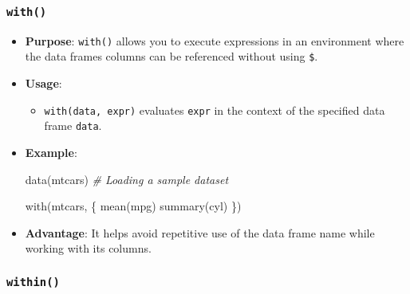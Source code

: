\documentclass[
]{article}
\newenvironment{Shaded}{}{}
\newcommand{\CommentTok}[1]{\textcolor[rgb]{0.38,0.63,0.69}{\textit{#1}}}
\newcommand{\FunctionTok}[1]{\textcolor[rgb]{0.02,0.16,0.49}{#1}}
\newcommand{\NormalTok}[1]{#1}
\begin{document}
\hypertarget{with}{%
\subsubsection{\texorpdfstring{\texttt{with()}}{with()}}\label{with}}

\begin{itemize}
\item
  \textbf{Purpose}: \texttt{with()} allows you to execute expressions in
  an environment where the data frame\textquotesingle s columns can be
  referenced without using \texttt{\$}.
\item
  \textbf{Usage}:

  \begin{itemize}
  \item
    \texttt{with(data,\ expr)} evaluates \texttt{expr} in the context of
    the specified data frame \texttt{data}.
  \end{itemize}
\item
  \textbf{Example}:

\begin{Shaded}
\begin{Highlighting}[]
\FunctionTok{data}\NormalTok{(mtcars) }\CommentTok{\# Loading a sample dataset}

\FunctionTok{with}\NormalTok{(mtcars, \{}
  \FunctionTok{mean}\NormalTok{(mpg)}
  \FunctionTok{summary}\NormalTok{(cyl)}
\NormalTok{  \})}
\end{Highlighting}
\end{Shaded}
\item
  \textbf{Advantage}: It helps avoid repetitive use of the data frame
  name while working with its columns.
\end{itemize}

\hypertarget{within}{%
\subsubsection{\texorpdfstring{\texttt{within()}}{within()}}\label{within}}
\end{document}
